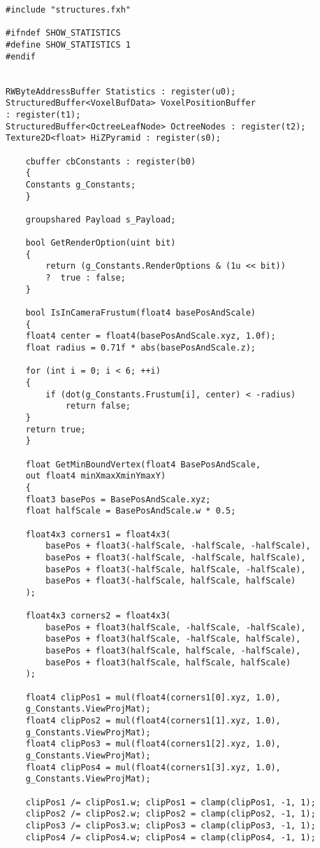 \begin{lstlisting}
#include "structures.fxh"

#ifndef SHOW_STATISTICS
#define SHOW_STATISTICS 1
#endif


RWByteAddressBuffer Statistics : register(u0);
StructuredBuffer<VoxelBufData> VoxelPositionBuffer 
: register(t1);
StructuredBuffer<OctreeLeafNode> OctreeNodes : register(t2);
Texture2D<float> HiZPyramid : register(s0);

    cbuffer cbConstants : register(b0)
    {
    Constants g_Constants;
    }

    groupshared Payload s_Payload;

    bool GetRenderOption(uint bit)
    {
        return (g_Constants.RenderOptions & (1u << bit)) 
        ?  true : false;
    }

    bool IsInCameraFrustum(float4 basePosAndScale)
    {
    float4 center = float4(basePosAndScale.xyz, 1.0f);
    float radius = 0.71f * abs(basePosAndScale.z);
    
    for (int i = 0; i < 6; ++i)
    {
        if (dot(g_Constants.Frustum[i], center) < -radius)
            return false;
    }
    return true;
    }

    float GetMinBoundVertex(float4 BasePosAndScale, 
    out float4 minXmaxXminYmaxY)
    {
    float3 basePos = BasePosAndScale.xyz;
    float halfScale = BasePosAndScale.w * 0.5;
    
    float4x3 corners1 = float4x3(
        basePos + float3(-halfScale, -halfScale, -halfScale),
        basePos + float3(-halfScale, -halfScale, halfScale),
        basePos + float3(-halfScale, halfScale, -halfScale),
        basePos + float3(-halfScale, halfScale, halfScale)
    );
    
    float4x3 corners2 = float4x3(
        basePos + float3(halfScale, -halfScale, -halfScale),
        basePos + float3(halfScale, -halfScale, halfScale),
        basePos + float3(halfScale, halfScale, -halfScale),
        basePos + float3(halfScale, halfScale, halfScale)
    );
    
    float4 clipPos1 = mul(float4(corners1[0].xyz, 1.0), 
    g_Constants.ViewProjMat);
    float4 clipPos2 = mul(float4(corners1[1].xyz, 1.0), 
    g_Constants.ViewProjMat);
    float4 clipPos3 = mul(float4(corners1[2].xyz, 1.0), 
    g_Constants.ViewProjMat);
    float4 clipPos4 = mul(float4(corners1[3].xyz, 1.0), 
    g_Constants.ViewProjMat);
        
    clipPos1 /= clipPos1.w; clipPos1 = clamp(clipPos1, -1, 1);
    clipPos2 /= clipPos2.w; clipPos2 = clamp(clipPos2, -1, 1);
    clipPos3 /= clipPos3.w; clipPos3 = clamp(clipPos3, -1, 1);
    clipPos4 /= clipPos4.w; clipPos4 = clamp(clipPos4, -1, 1);
    

\end{lstlisting}
